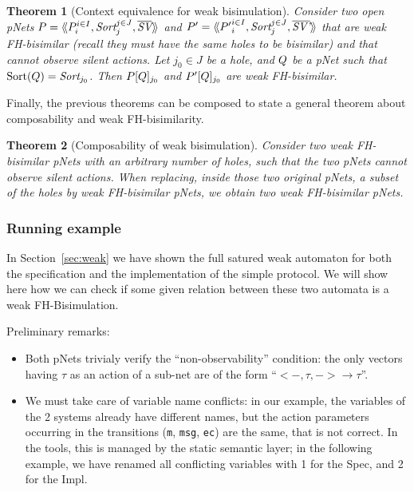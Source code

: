 \documentclass{lmcs}
\newtheorem{theorem}{Theorem}
\begin{document}
\begin{theorem}[Context equivalence for  weak bisimulation]\label{weak-thm-ctxt-eq}
	Consider two  open pNets
	$\pNet = \mylangle \pNet_i^{i\in I}, \Sort_j^{j\in J}, 
	\set{\symb{SV}}\myrangle$ and 	$\pNet' = \mylangle {\pNet'}_i^{i\in I}, 
	\Sort_j^{j\in 
	J}, 	\set{\symb{SV'}}\myrangle$ that are weak FH-bisimilar
	(recall they must have the same holes to be bisimilar) and that cannot observe silent actions.
	Let $j_0\in J$ be a hole, and $Q$ be a pNet such that $\Sortop(\pNetQ)=\Sort_{j_0}$. Then 
	$P[Q]_{j_0}$ and 
	$P'[Q]_{j_0}$ are weak FH-bisimilar.
\end{theorem}

Finally, the previous theorems can be composed to state a general theorem about 
composability and weak FH-bisimilarity.

\begin{theorem}[Composability of weak bisimulation]\label{weak-compos}
	Consider two weak FH-bisimilar pNets with an arbitrary number of holes, such that the two pNets cannot observe silent actions. When replacing, 
	inside those two original pNets, a subset of the holes by weak FH-bisimilar pNets, we 
	obtain two weak FH-bisimilar pNets.
\end{theorem}


\subsubsection*{Running example}
\label{subsubsection:runnig example}
In Section~\ref{sec:weak} we have shown the full satured weak automaton for both the specification and the implementation of the simple protocol. We will show here how we can check if some given relation between these two automata is a weak FH-Bisimulation. 

\medskip
\noindent
Preliminary remarks:
  \begin{itemize}
    \item Both pNets trivialy verify the ``non-observability''
      condition: the only vectors having $\tau$ as an action of a
      sub-net are of the form ``$< -, \tau, -> \rightarrow \tau$''.
    \item We must take care of variable name conflicts: in our example, the variables of the 2 systems already have different names, but the action parameters occurring in the transitions (\texttt{m}, \texttt{msg}, \texttt{ec}) are the same, that is not correct. In the tools, this is managed by the static semantic layer; in the following example, we have renamed all conflicting variables with 1 for the Spec, and 2 for the Impl.
    \end{itemize}
\end{document}
